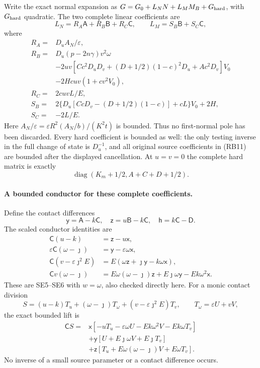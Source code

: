 Write the exact normal expansion as
$G=G_0+L_NN+L_MM_B+G_{\rm hard}$, with $G_{\rm hard}$ quadratic.
The two complete linear coefficients are
\[
 L_N=R_A\mathsf A+R_B\mathsf B+R_C\mathsf C,
 \qquad L_M=S_B\mathsf B+S_C\mathsf C,               \tag{RI11}
\]
where
\[
\begin{aligned}
 R_A={}&D_uA_N/\varepsilon,\\
 R_B={}&D_u(p-2n\gamma)v^2\omega\\
 &-2uv[Cc^2D_uD_v+(D+1/2)(1-c)^2D_u+Ac^2D_v]V_0\\
 &-2Hcuv(1+cv^2V_0),\\
 R_C={}&2cuvL/E,\\
 S_B={}&2\{D_u[CcD_v-(D+1/2)(1-c)]+cL\}V_0+2H,\\
 S_C={}&-2L/E.
\end{aligned}                                                      \tag{RI12}
\]
Here $A_N/\varepsilon=
\varepsilon R^2(A_N/b)/(K^2t)$ is bounded. Thus no first-normal
pole has been discarded. Every hard coefficient is bounded as well:
the only testing inverse in the full change of state is $D_u^{-1}$,
and all original source coefficients in (RB11) are bounded after the
displayed cancellation. At $u=v=0$ the complete hard matrix is exactly
\[
 \operatorname{diag}(K_m+1/2,A+C+D+1/2).             \tag{RI13}
\]

\paragraph{A bounded conductor for these complete coefficients.}
Define the contact differences
\[
 \mathsf y=\mathsf A-k\mathsf C,\quad
 \mathsf z=u\mathsf B-k\mathsf C,\quad
 \mathsf h=k\mathsf C-\mathsf D.
\]
The scaled conductor identities are
\[
\begin{aligned}
 \mathsf C(u-k)&=\mathsf z-u\mathsf x,\\
 \varepsilon\mathsf C(\omega-\jmath)
       &=\mathsf y-\varepsilon\omega\mathsf x,\\
 \mathsf C(v-\varepsilon\jmath^2E)
       &=E(\omega\mathsf z+\jmath\mathsf y-k\omega\mathsf x),\\
 \mathsf Cv(\omega-\jmath)
       &=E\omega(\omega-\jmath)\mathsf z+
         E\jmath\omega\mathsf y-Ek\omega^2\mathsf x.
\end{aligned}                                                       \tag{RI14}
\]
These are SE5--SE6 with $w=\omega$, also checked directly here.
For a monic contact division
\[
 S=(u-k)T_u+(\omega-\jmath)T_\omega+
           (v-\varepsilon\jmath^2E)T_v,
 \qquad T_\omega=\varepsilon U+vV,
\]
the exact bounded lift is
\[
\begin{aligned}
 \mathsf CS={}&\mathsf x[-uT_u-\varepsilon\omega U
                    -Ek\omega^2V-Ek\omega T_v]\\
 &+\mathsf y[U+E\jmath\omega V+E\jmath T_v]\\
 &+\mathsf z[T_u+E\omega(\omega-\jmath)V+E\omega T_v].
\end{aligned}                                                       \tag{RI15}
\]
No inverse of a small source parameter or a contact difference occurs.

